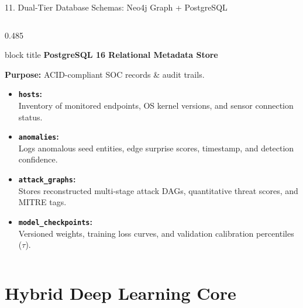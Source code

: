\documentclass[aspectratio=169,10pt]{beamer}
\begin{document}
\begin{frame}{11. Dual-Tier Database Schemas: Neo4j Graph + PostgreSQL}
\begin{columns}[T]
\begin{column}{0.485\textwidth}
\begin{beamercolorbox}[rounded=true,shadow=false,sep=0.30em,wd=\linewidth]{block title}
\textbf{\scriptsize PostgreSQL 16 Relational Metadata Store}
\end{beamercolorbox}
\vspace{0.12em}
{\fontsize{7.0pt}{9.8pt}\selectfont
\textbf{Purpose:} ACID-compliant SOC records \& audit trails.
\begin{itemize}\itemsep0.20em
  \item \textbf{\texttt{hosts}:}\\
  Inventory of monitored endpoints, OS kernel versions, and sensor connection status.
  \item \textbf{\texttt{anomalies}:}\\
  Logs anomalous seed entities, edge surprise scores, timestamp, and detection confidence.
  \item \textbf{\texttt{attack\_graphs}:}\\
  Stores reconstructed multi-stage attack DAGs, quantitative threat scores, and MITRE tags.
  \item \textbf{\texttt{model\_checkpoints}:}\\
  Versioned weights, training loss curves, and validation calibration percentiles ($\tau$).
\end{itemize}
}
\end{column}
\end{columns}
\end{frame}

\section{Hybrid Deep Learning Core}
\end{document}
